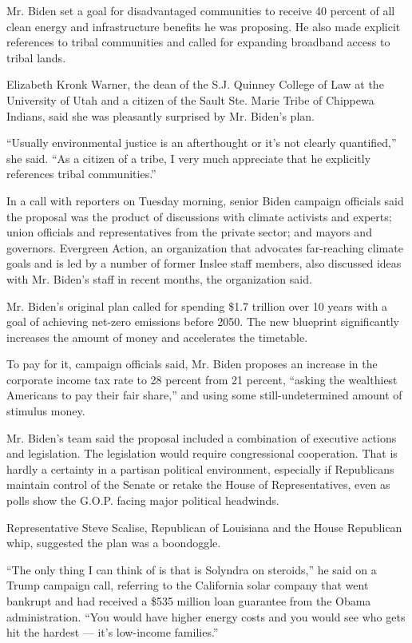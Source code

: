 Mr. Biden set a goal for disadvantaged communities to receive 40 percent
of all clean energy and infrastructure benefits he was proposing. He
also made explicit references to tribal communities and called for
expanding broadband access to tribal lands.

Elizabeth Kronk Warner, the dean of the S.J. Quinney College of Law at
the University of Utah and a citizen of the Sault Ste. Marie Tribe of
Chippewa Indians, said she was pleasantly surprised by Mr. Biden's plan.

``Usually environmental justice is an afterthought or it's not clearly
quantified,'' she said. ``As a citizen of a tribe, I very much
appreciate that he explicitly references tribal communities.''

In a call with reporters on Tuesday morning, senior Biden campaign
officials said the proposal was the product of discussions with climate
activists and experts; union officials and representatives from the
private sector; and mayors and governors. Evergreen Action, an
organization that advocates far-reaching climate goals and is led by a
number of former Inslee staff members, also discussed ideas with Mr.
Biden's staff in recent months, the organization said.

Mr. Biden's original plan called for spending \$1.7 trillion over 10
years with a goal of achieving net-zero emissions before 2050. The new
blueprint significantly increases the amount of money and accelerates
the timetable.

To pay for it, campaign officials said, Mr. Biden proposes an increase
in the corporate income tax rate to 28 percent from 21 percent, ``asking
the wealthiest Americans to pay their fair share,'' and using some
still-undetermined amount of stimulus money.

Mr. Biden's team said the proposal included a combination of executive
actions and legislation. The legislation would require congressional
cooperation. That is hardly a certainty in a partisan political
environment, especially if Republicans maintain control of the Senate or
retake the House of Representatives, even as polls show the G.O.P.
facing major political headwinds.

Representative Steve Scalise, Republican of Louisiana and the House
Republican whip, suggested the plan was a boondoggle.

``The only thing I can think of is that is Solyndra on steroids,'' he
said on a Trump campaign call, referring to the California solar company
that went bankrupt and had received a \$535 million loan guarantee from
the Obama administration. ``You would have higher energy costs and you
would see who gets hit the hardest --- it's low-income families.''

